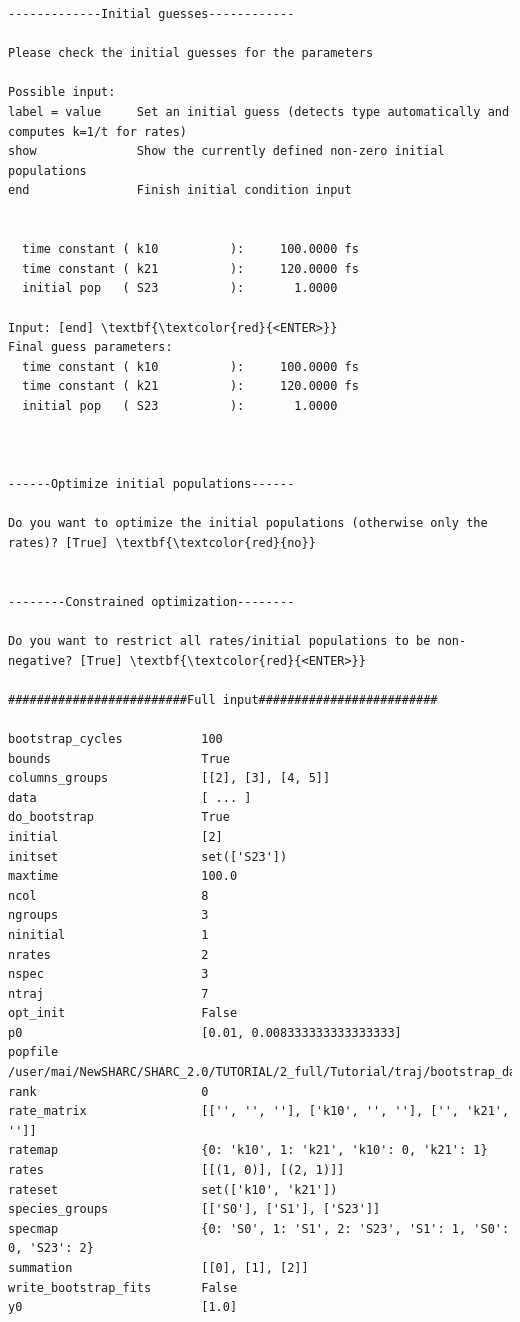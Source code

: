 \documentclass[a4paper,11pt,DIV=15,openany]{scrbook}
\begin{document}
\begin{oframed}
\begin{Verbatim}[commandchars=\\\{\}]
-------------Initial guesses------------

Please check the initial guesses for the parameters

Possible input:
label = value     Set an initial guess (detects type automatically and computes k=1/t for rates)
show              Show the currently defined non-zero initial populations
end               Finish initial condition input


  time constant ( k10          ):     100.0000 fs
  time constant ( k21          ):     120.0000 fs
  initial pop   ( S23          ):       1.0000

Input: [end] \textbf{\textcolor{red}{<ENTER>}}
Final guess parameters:
  time constant ( k10          ):     100.0000 fs
  time constant ( k21          ):     120.0000 fs
  initial pop   ( S23          ):       1.0000



------Optimize initial populations------

Do you want to optimize the initial populations (otherwise only the rates)? [True] \textbf{\textcolor{red}{no}}


--------Constrained optimization--------

Do you want to restrict all rates/initial populations to be non-negative? [True] \textbf{\textcolor{red}{<ENTER>}}

#########################Full input#########################

bootstrap_cycles           100
bounds                     True
columns_groups             [[2], [3], [4, 5]]
data                       [ ... ]
do_bootstrap               True
initial                    [2]
initset                    set(['S23'])
maxtime                    100.0
ncol                       8
ngroups                    3
ninitial                   1
nrates                     2
nspec                      3
ntraj                      7
opt_init                   False
p0                         [0.01, 0.008333333333333333]
popfile                    /user/mai/NewSHARC/SHARC_2.0/TUTORIAL/2_full/Tutorial/traj/bootstrap_data
rank                       0
rate_matrix                [['', '', ''], ['k10', '', ''], ['', 'k21', '']]
ratemap                    {0: 'k10', 1: 'k21', 'k10': 0, 'k21': 1}
rates                      [[(1, 0)], [(2, 1)]]
rateset                    set(['k10', 'k21'])
species_groups             [['S0'], ['S1'], ['S23']]
specmap                    {0: 'S0', 1: 'S1', 2: 'S23', 'S1': 1, 'S0': 0, 'S23': 2}
summation                  [[0], [1], [2]]
write_bootstrap_fits       False
y0                         [1.0]


\end{Verbatim}
\end{oframed}
\end{document}

